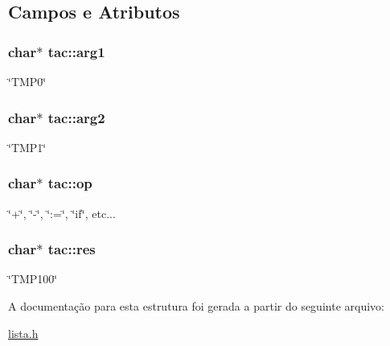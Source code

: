 \subsection{Campos e Atributos}
\hypertarget{structtac_a473f301b4f09061170fd4042cec395cf}{
\subsubsection[{arg1}]{\setlength{\rightskip}{0pt plus 5cm}char$\ast$ {\bf tac::arg1}}}
\label{structtac_a473f301b4f09061170fd4042cec395cf}
\char`\"{}TMP0\char`\"{} \hypertarget{structtac_a6fb90118ff84ebfb171852afd4a31a37}{
\subsubsection[{arg2}]{\setlength{\rightskip}{0pt plus 5cm}char$\ast$ {\bf tac::arg2}}}
\label{structtac_a6fb90118ff84ebfb171852afd4a31a37}
\char`\"{}TMP1\char`\"{} \hypertarget{structtac_a95f9c50b359afc15df11bdbf029651d7}{
\subsubsection[{op}]{\setlength{\rightskip}{0pt plus 5cm}char$\ast$ {\bf tac::op}}}
\label{structtac_a95f9c50b359afc15df11bdbf029651d7}
\char`\"{}+\char`\"{}, \char`\"{}-\/\char`\"{}, \char`\"{}:=\char`\"{}, \char`\"{}if\char`\"{}, etc... \hypertarget{structtac_ab9916cad43f718ed7a316e94ce80bab1}{
\subsubsection[{res}]{\setlength{\rightskip}{0pt plus 5cm}char$\ast$ {\bf tac::res}}}
\label{structtac_ab9916cad43f718ed7a316e94ce80bab1}
\char`\"{}TMP100\char`\"{} 

A documentação para esta estrutura foi gerada a partir do seguinte arquivo:\begin{DoxyCompactItemize}
\item 
\hyperlink{lista_8h}{lista.h}\end{DoxyCompactItemize}

